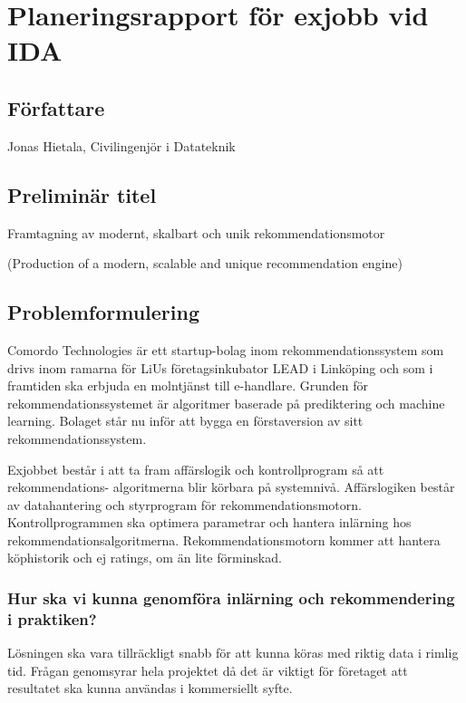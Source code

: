 \documentclass[11pt]{article}
\begin{document}
\section*{Planeringsrapport för exjobb vid IDA}

\subsection*{Författare}

Jonas Hietala, Civilingenjör i Datateknik

\subsection*{Preliminär titel}

Framtagning av modernt, skalbart och unik rekommendationsmotor

(Production of a modern, scalable and unique recommendation engine)

\subsection*{Problemformulering}

Comordo Technologies är ett startup-bolag inom rekommendationssystem som drivs inom ramarna för LiUs företagsinkubator LEAD i Linköping och som i framtiden ska erbjuda en molntjänst till e-handlare. Grunden för rekommendationssystemet är algoritmer baserade på prediktering och machine learning. Bolaget står nu inför att bygga en förstaversion av sitt rekommendationssystem.

Exjobbet består i att ta fram affärslogik och kontrollprogram så att rekommendations- algoritmerna blir körbara på systemnivå. Affärslogiken består av datahantering och styrprogram för rekommendationsmotorn. Kontrollprogrammen ska optimera parametrar och hantera inlärning hos rekommendationsalgoritmerna. Rekommendationsmotorn kommer att hantera köphistorik och ej ratings, om än lite förminskad.


\subsubsection*{Hur ska vi kunna genomföra inlärning och rekommendering i praktiken?}

Lösningen ska vara tillräckligt snabb för att kunna köras med riktig data i rimlig tid. Frågan genomsyrar hela projektet då det är viktigt för företaget att resultatet ska kunna användas i kommersiellt syfte.
\end{document}

